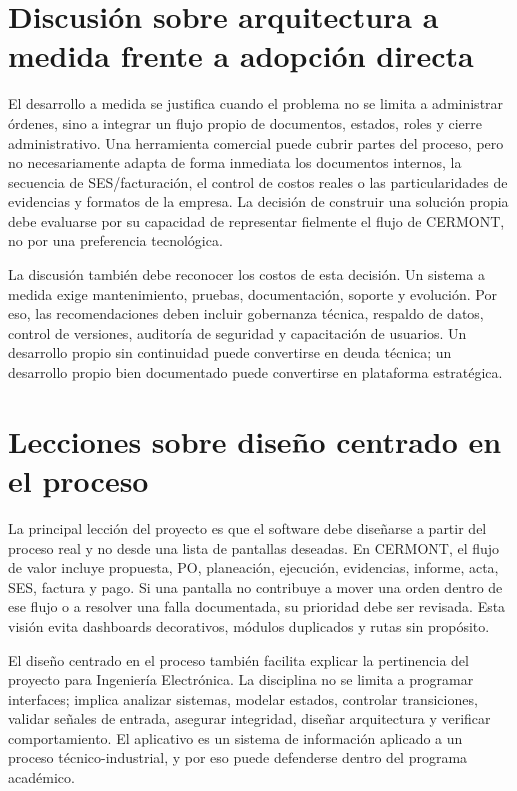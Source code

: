 \section{Discusión sobre arquitectura a medida frente a adopción directa}
\label{sec:discusion-arquitectura-medida-adopcion}

El desarrollo a medida se justifica cuando el problema no se limita a administrar órdenes, sino a integrar un flujo propio de documentos, estados, roles y cierre administrativo. Una herramienta comercial puede cubrir partes del proceso, pero no necesariamente adapta de forma inmediata los documentos internos, la secuencia de SES/facturación, el control de costos reales o las particularidades de evidencias y formatos de la empresa. La decisión de construir una solución propia debe evaluarse por su capacidad de representar fielmente el flujo de CERMONT, no por una preferencia tecnológica.

La discusión también debe reconocer los costos de esta decisión. Un sistema a medida exige mantenimiento, pruebas, documentación, soporte y evolución. Por eso, las recomendaciones deben incluir gobernanza técnica, respaldo de datos, control de versiones, auditoría de seguridad y capacitación de usuarios. Un desarrollo propio sin continuidad puede convertirse en deuda técnica; un desarrollo propio bien documentado puede convertirse en plataforma estratégica.

\section{Lecciones sobre diseño centrado en el proceso}
\label{sec:lecciones-diseno-centrado-proceso}

La principal lección del proyecto es que el software debe diseñarse a partir del proceso real y no desde una lista de pantallas deseadas. En CERMONT, el flujo de valor incluye propuesta, PO, planeación, ejecución, evidencias, informe, acta, SES, factura y pago. Si una pantalla no contribuye a mover una orden dentro de ese flujo o a resolver una falla documentada, su prioridad debe ser revisada. Esta visión evita dashboards decorativos, módulos duplicados y rutas sin propósito.

El diseño centrado en el proceso también facilita explicar la pertinencia del proyecto para Ingeniería Electrónica. La disciplina no se limita a programar interfaces; implica analizar sistemas, modelar estados, controlar transiciones, validar señales de entrada, asegurar integridad, diseñar arquitectura y verificar comportamiento. El aplicativo es un sistema de información aplicado a un proceso técnico-industrial, y por eso puede defenderse dentro del programa académico.

